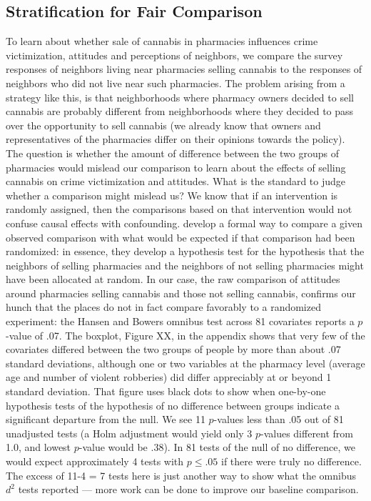 \documentclass[11pt]{article}
\begin{document}
\subsection{Stratification for Fair Comparison}
To learn about whether sale of cannabis in pharmacies influences crime victimization, attitudes and perceptions of neighbors, we compare the survey responses of neighbors living near pharmacies selling cannabis to the responses of neighbors who did not live near such pharmacies. The problem arising from a strategy like this, is that neighborhoods where pharmacy owners decided to sell cannabis are probably different from neighborhoods where they decided to pass over the opportunity to sell cannabis (we already know that owners and representatives of the pharmacies differ on their opinions towards the policy). The question is whether the amount of difference between the two groups of pharmacies would mislead our comparison to learn about the effects of selling cannabis on crime victimization and attitudes. What is the standard to judge whether a comparison might mislead us? We know that if an intervention is randomly assigned, then the comparisons based on that intervention would not confuse causal effects with confounding. \citet{hansen2008cbs} develop a formal way to compare a given observed comparison with what would be expected if that comparison had been randomized: in essence, they develop a hypothesis test for the hypothesis that the neighbors of selling pharmacies and the neighbors of not selling pharmacies might have been allocated at random. In our case, the raw comparison of attitudes around pharmacies selling cannabis and those not selling cannabis, confirms our hunch that the places do not in fact compare favorably to a randomized experiment:  the Hansen and Bowers omnibus test across 81 covariates reports a $p$-value of .07. The boxplot, Figure XX, in the  appendix shows that very few of the covariates differed between the two groups of people by more than about .07 standard deviations, although one or two variables at the pharmacy level (average age and number of violent robberies) did differ appreciably at or beyond 1 standard deviation. That figure uses black dots to show when one-by-one hypothesis tests of the hypothesis of no difference between groups indicate a significant departure from the null. We see 11 $p$-values less than .05 out of 81 unadjusted tests (a Holm adjustment would yield only 3 $p$-values different from 1.0, and lowest $p$-value would be .38). In 81 tests of the null of no difference, we would expect approximately 4 tests with $p \le .05$ if there were truly no difference. The excess of 11-4 = 7 tests here is just another way to show what the omnibus $d^2$ tests reported --- more work can be done to improve our baseline comparison.
\end{document}
